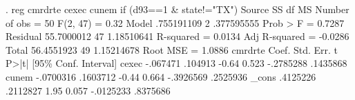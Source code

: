 . reg cmrdrte cexec cunem if (d93==1 \& state!="TX")
{\smallskip}
      Source {\VBAR}       SS           df       MS      Number of obs   =        50
   F(2, 47)        =      0.32
       Model {\VBAR}  .755191109         2  .377595555   Prob > F        =    0.7287
    Residual {\VBAR}  55.7000012        47  1.18510641   R-squared       =    0.0134
   Adj R-squared   =   -0.0286
       Total {\VBAR}  56.4551923        49  1.15214678   Root MSE        =    1.0886
{\smallskip}
     cmrdrte {\VBAR}      Coef.   Std. Err.      t    P>|t|     [95\% Conf. Interval]
       cexec {\VBAR}   -.067471    .104913    -0.64   0.523    -.2785288    .1435868
       cunem {\VBAR}  -.0700316   .1603712    -0.44   0.664    -.3926569    .2525936
       _cons {\VBAR}   .4125226   .2112827     1.95   0.057    -.0125233    .8375686
{\smallskip}
